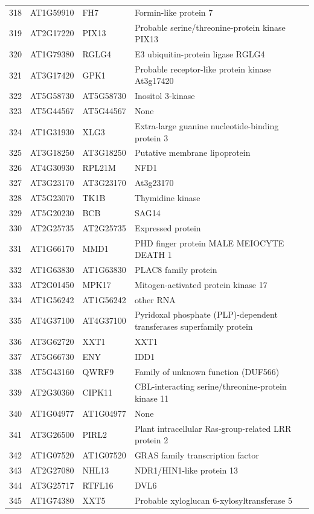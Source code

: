 \documentclass[11pt]{article}
\begin{document}
\begin{center}
\begin{tabular}{rlll}
318 & AT1G59910 & FH7 & Formin-like protein 7\\
319 & AT2G17220 & PIX13 & Probable serine/threonine-protein kinase PIX13\\
320 & AT1G79380 & RGLG4 & E3 ubiquitin-protein ligase RGLG4\\
321 & AT3G17420 & GPK1 & Probable receptor-like protein kinase At3g17420\\
322 & AT5G58730 & AT5G58730 & Inositol 3-kinase\\
323 & AT5G44567 & AT5G44567 & None\\
324 & AT1G31930 & XLG3 & Extra-large guanine nucleotide-binding protein 3\\
325 & AT3G18250 & AT3G18250 & Putative membrane lipoprotein\\
326 & AT4G30930 & RPL21M & NFD1\\
327 & AT3G23170 & AT3G23170 & At3g23170\\
328 & AT5G23070 & TK1B & Thymidine kinase\\
329 & AT5G20230 & BCB & SAG14\\
330 & AT2G25735 & AT2G25735 & Expressed protein\\
331 & AT1G66170 & MMD1 & PHD finger protein MALE MEIOCYTE DEATH 1\\
332 & AT1G63830 & AT1G63830 & PLAC8 family protein\\
333 & AT2G01450 & MPK17 & Mitogen-activated protein kinase 17\\
334 & AT1G56242 & AT1G56242 & other RNA\\
335 & AT4G37100 & AT4G37100 & Pyridoxal phosphate (PLP)-dependent transferases superfamily protein\\
336 & AT3G62720 & XXT1 & XXT1\\
337 & AT5G66730 & ENY & IDD1\\
338 & AT5G43160 & QWRF9 & Family of unknown function (DUF566)\\
339 & AT2G30360 & CIPK11 & CBL-interacting serine/threonine-protein kinase 11\\
340 & AT1G04977 & AT1G04977 & None\\
341 & AT3G26500 & PIRL2 & Plant intracellular Ras-group-related LRR protein 2\\
342 & AT1G07520 & AT1G07520 & GRAS family transcription factor\\
343 & AT2G27080 & NHL13 & NDR1/HIN1-like protein 13\\
344 & AT3G25717 & RTFL16 & DVL6\\
345 & AT1G74380 & XXT5 & Probable xyloglucan 6-xylosyltransferase 5\\

\end{tabular}
\end{center}
\end{document}
